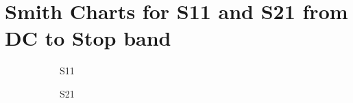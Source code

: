\documentclass[letterpaper,12pt]{article}
\begin{document}
\section{Smith Charts for S11 and S21 from DC to Stop band}
\begin{figure}[H]
    \begin{subfigure}[t]{.49\textwidth}
        \centering
        S11
    \end{subfigure}
    \hfill
    \begin{subfigure}[t]{.49\textwidth}
        \centering
        S21
    \end{subfigure}

    \medskip
    

\end{figure}
\end{document}

